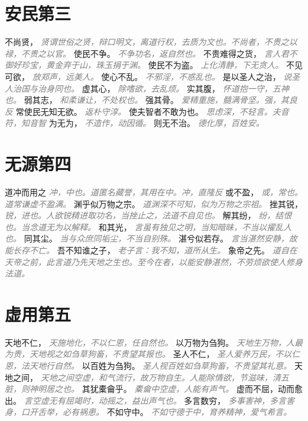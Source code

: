 \documentclass[a4paper,zihao=-4,oneside,landscape,UTF8]{ctexart}
\newcommand{\zhushi}[1]{\scriptsize{\textit{\textcolor{gray}{#1}}}\normalsize}
\begin{document}
\section{安民第三}

不尚贤，
\zhushi{贤谓世俗之贤，辩口明文，离道行权，去质为文也。不尚者，不贵之以禄，不贵之以官。}
使民不争。
\zhushi{不争功名，返自然也。}
不贵难得之货，
\zhushi{言人君不御好珍宝，黄金弃于山，珠玉捐于渊。}
使民不为盗。
\zhushi{上化清静，下无贪人。}
不见可欲，
\zhushi{放郑声，远美人。}
使心不乱。
\zhushi{不邪淫，不惑乱也。}
是以圣人之治，
\zhushi{说圣人治国与治身同也。}
虚其心，
\zhushi{除嗜欲，去乱烦。}
实其腹，
\zhushi{怀道抱一守，五神也。}
弱其志，
\zhushi{和柔谦让，不处权也。}
强其骨。
\zhushi{爱精重施，髓满骨坚。强，其良反}
常使民无知无欲。
\zhushi{返朴守淳。}
使夫智者不敢为也。
\zhushi{思虑深，不轻言。夫音符，知音智}
为无为，
\zhushi{不造作，动因循。}
则无不治。
\zhushi{德化厚，百姓安。}


\section{无源第四}

道冲而用之
\zhushi{冲，中也。道匿名藏誉，其用在中。冲，直隆反}
或不盈，
\zhushi{或，常也。道常谦虚不盈满。}
渊乎似万物之宗。
\zhushi{道渊深不可知，似为万物之宗祖。}
挫其锐，
\zhushi{锐，进也。人欲锐精进取功名，当挫止之，法道不自见也。}
解其纷，
\zhushi{纷，结恨也。当念道无为以解释。}
和其光，
\zhushi{言虽有独见之明，当知暗昧，不当以擢乱人也。}
同其尘。
\zhushi{当与众庶同垢尘，不当自别殊。}
湛兮似若存。
\zhushi{言当湛然安静，故能长存不亡。}
吾不知谁之子，
\zhushi{老子言：我不知，道所从生。}
象帝之先。
\zhushi{道自在天帝之前，此言道乃先天地之生也。至今在者，以能安静湛然，不劳烦欲使人修身法道。}


\section{虚用第五}

天地不仁，
\zhushi{天施地化，不以仁恩，任自然也。}
以万物为刍狗。
\zhushi{天地生万物，人最为贵，天地视之如刍草狗畜，不贵望其报也。}
圣人不仁，
\zhushi{圣人爱养万民，不以仁恩，法天地行自然。}
以百姓为刍狗。
\zhushi{圣人视百姓如刍草狗畜，不贵望其礼意。}
天地之间，
\zhushi{天地之间空虚，和气流行，故万物自生。人能除情欲，节滋味，清五脏，则神明居之也。}
其犹橐龠乎。
\zhushi{橐龠中空虚，人能有声气。}
虚而不屈，动而愈出。
\zhushi{言空虚无有屈竭时，动摇之，益出声气也。}
多言数穷，
\zhushi{多事害神，多言害身，口开舌举，必有祸患。}
不如守中。
\zhushi{不如守德于中，育养精神，爱气希言。}
\end{document}
